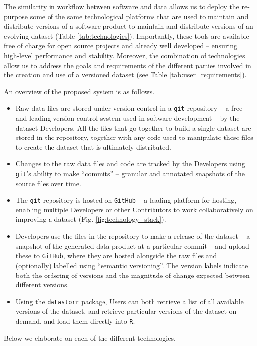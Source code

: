 \documentclass[a4paper,num-refs]{assets/oup-contemporary}
\begin{document}
The similarity in workflow between software and data allows us to deploy the re-purpose some of the same technological platforms that are used to maintain and distribute versions of a software product to maintain and distribute versions of an evolving dataset (Table \ref{tab:technologies}). Importantly, these tools are available free of charge for open source projects and already well developed -- ensuring high-level performance and stability. Moreover, the combination of technologies allow us to address the goals and requirements of the different parties involved in the creation and use of a versioned dataset (see Table \ref{tab:user_requirements}). 

An overview of the proposed system is as follows.
\begin{itemize}
  \item Raw data files are stored under version control in a \texttt{git} repository --  a free and leading version control system used in software development -- by the dataset Developers. All the files that go together to build a single dataset are stored in the repository, together with any code used to manipulate these files to create the dataset that is ultimately distributed.
  \item Changes to the raw data files and code are tracked by the Developers using  \texttt{git}'s ability to make ``commits'' -- granular and annotated snapshots of the source files over time.
  \item The \texttt{git} repository is hosted on \texttt{GitHub} -- a leading platform for hosting, enabling multiple Developers or other Contributors to work collaboratively on improving a dataset (Fig. \ref{fig:technology_stack}).
  \item Developers use the files in the repository to make a release of the dataset -- a snapshot of the generated data product at a particular commit -- and upload these to \texttt{GitHub}, where they are hosted alongside the raw files and (optionally) labelled using ``semantic versioning''. The version labels indicate both the ordering of versions and the magnitude of change expected between different versions.
  \item Using the \texttt{datastorr} package, Users can both retrieve a list of all available versions of the dataset, and retrieve particular versions of the dataset on demand, and load them directly into \texttt{R}. 
\end{itemize}

Below we elaborate on each of the different technologies.
\end{document}

